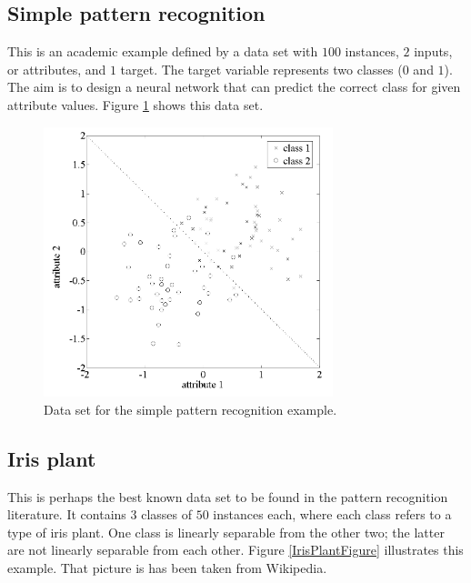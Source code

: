 \subsection*{Simple pattern recognition}

This is an academic example defined by a data set with $100$ instances, $2$ inputs, or attributes, and $1$ target. 
The target variable represents two classes ($0$ and $1$). 
The aim is to design a neural network that can predict the correct class for given attribute values. 
Figure \ref{SimplePatternRecognitionFigure} shows this data set.

\begin{figure}[!hbp]
\begin{center}
\includegraphics[width=0.75\textwidth]{pattern_recognition/simple_pattern_recognition_data_set.png}
\caption{Data set for the simple pattern recognition example.}\label{SimplePatternRecognitionFigure}
\end{center}
\end{figure}

\subsection*{Iris plant}

This is perhaps the best known data set to be found in the pattern recognition literature. 
It contains $3$ classes of $50$ instances each, where each class refers to a type of iris plant. 
One class is linearly separable from the other two; the latter are not linearly separable from each other.
Figure \ref{IrisPlantFigure} illustrates this example. That picture is has been taken from Wikipedia.  

